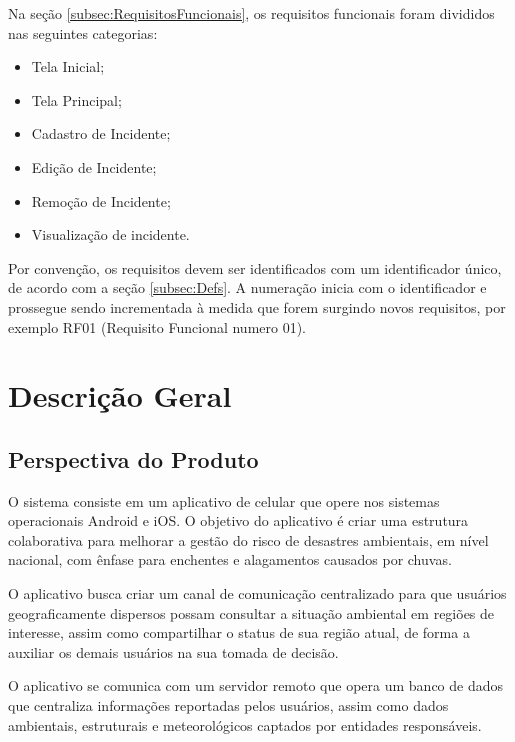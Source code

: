\documentclass[12pt]{article}
\begin{document}
Na seção \ref{subsec:RequisitosFuncionais}, os requisitos funcionais foram divididos nas seguintes categorias:
\begin{itemize}
    \item Tela Inicial;
    \item Tela Principal;
    \item Cadastro de Incidente;
    \item Edição de Incidente;
    \item Remoção de Incidente;
    \item Visualização de incidente.
\end{itemize}

Por convenção, os requisitos devem ser identificados com um identificador único, de acordo com a seção \ref{subsec:Defs}. A numeração inicia com o identificador e prossegue sendo incrementada à medida que forem surgindo novos requisitos, por exemplo RF01 (Requisito Funcional numero 01).

\section{Descrição Geral}
\subsection{Perspectiva do Produto}
O sistema consiste em um aplicativo de celular que opere nos sistemas operacionais Android e iOS. O objetivo do aplicativo é criar uma estrutura colaborativa para melhorar a gestão do risco de desastres ambientais, em nível nacional, com ênfase para enchentes e alagamentos causados por chuvas.

O aplicativo busca criar um canal de comunicação centralizado para que usuários geograficamente dispersos possam consultar a situação ambiental em regiões de interesse, assim como compartilhar o status de sua região atual, de forma a auxiliar os demais usuários na sua tomada de decisão. 

O aplicativo se comunica com um servidor remoto que opera um banco de dados que centraliza informações reportadas pelos usuários, assim como dados ambientais, estruturais e meteorológicos captados por entidades responsáveis. 
\end{document}
